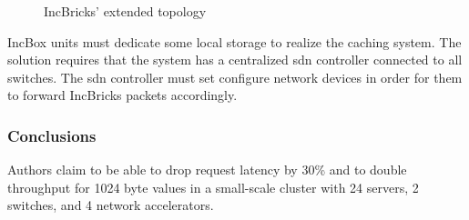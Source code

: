 \begin{figure}[!htb]
    \centering
    \usebox{\incbricksextended}
    \caption{IncBricks' \texorpdfstring{\cite{incbricks}}{} extended topology}
\end{figure}

IncBox units must dedicate some local storage to realize the caching system.
The solution requires that the system has a centralized \gls{sdn} controller connected to all switches.
The \gls{sdn} controller must set configure network devices in order for them to forward IncBricks \cite{incbricks} packets accordingly.

\subsubsection{Conclusions}
Authors claim to be able to drop request latency by 30\% and to double throughput for 1024 byte values in a small-scale cluster with 24 servers, 2 switches, and 4 network accelerators.